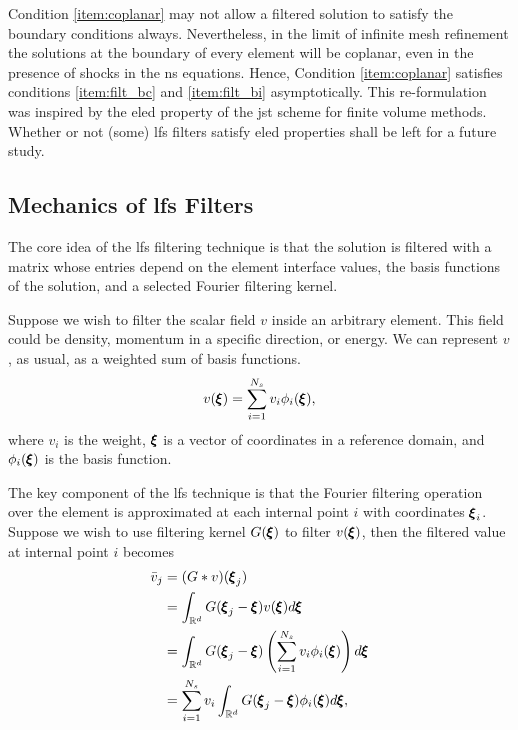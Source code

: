 Condition \ref{item:coplanar} may not allow a filtered solution to satisfy the boundary conditions always. Nevertheless, in the limit of infinite mesh refinement the solutions at the boundary of every element will be coplanar, even in the presence of shocks in the \gls{ns}  equations. Hence, Condition \ref{item:coplanar} satisfies conditions \ref{item:filt_bc} and \ref{item:filt_bi} asymptotically. This re-formulation was inspired by the \gls{eled}  property of the \gls{jst}  scheme\cite{jameson1981numerical} for finite volume methods. Whether or not (some) \gls{lfs} filters satisfy \gls{eled}  properties shall be left for a future study.


\subsection{Mechanics of \gls{lfs} Filters}

The core idea of the \gls{lfs} filtering technique is that the solution is filtered with a matrix whose entries depend on the element interface values, the basis functions of the solution, and a selected Fourier filtering kernel.

Suppose we wish to filter the scalar field $v$ inside an arbitrary element. This field could be density, momentum in a specific direction, or energy. We can represent $v$, as usual, as a weighted sum of basis functions.
\begin{equation}
\label{eqn:polyexp}
v({\pmb \xi}) = \sum^{N_s}_{i=1} v_i \phi_i({\pmb \xi}),
\end{equation}
where $v_i$ is the \ith weight, ${\pmb \xi}$ is a vector of coordinates in a reference domain, and $\phi_i({\pmb \xi})$ is the \ith basis function.

The key component of the \gls{lfs} technique is that the Fourier filtering operation over the element is approximated at each internal point $i$ with coordinates ${\pmb \xi}_i$. Suppose we wish to use filtering kernel $G({\pmb \xi})$ to filter $v({\pmb \xi})$, then the filtered value at internal point $i$ becomes
\begin{equation}
\label{eqn:convolution}
\begin{split}
\bar{v}_j &= (G \ast v)({\pmb \xi}_j)\\
&= \int_{\mathbb{R}^d} G({\pmb \xi}_j - {\pmb \xi})v({\pmb \xi})d{\pmb \xi}\\
&= \int_{\mathbb{R}^d} G({\pmb \xi}_j - {\pmb \xi})\left(\sum^{N_s}_{i=1} v_i \phi_i({\pmb \xi})\right)d{\pmb \xi}\\
&= \sum^{N_s}_{i=1}v_i\int_{\mathbb{R}^d} G({\pmb \xi}_j - {\pmb \xi})  \phi_i({\pmb \xi})d{\pmb \xi},\\
\end{split}
\end{equation}

